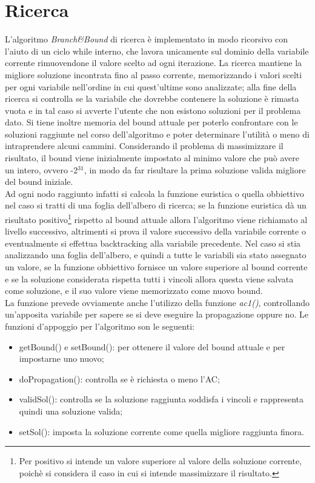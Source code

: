 \documentclass[a4paper,12pt,italian]{article}
\begin{document}
\section{Ricerca}

L'algoritmo \textit{Branch\&Bound} di ricerca \`e implementato in modo ricorsivo
con l'aiuto di un ciclo while interno, che lavora unicamente sul
dominio della variabile corrente rimuovendone il valore scelto ad ogni iterazione.
La ricerca mantiene la migliore soluzione incontrata fino al passo corrente,
memorizzando i valori scelti per ogni variabile nell'ordine in cui quest'ultime sono analizzate;
alla fine della ricerca si controlla se la variabile che dovrebbe contenere la soluzione
\`e rimasta vuota e in tal caso si avverte l'utente che non esistono soluzioni per il problema dato.
Si tiene inoltre memoria del bound attuale per poterlo confrontare con le
soluzioni raggiunte nel corso dell'algoritmo e poter determinare l'utilit\`a o meno
di intraprendere alcuni cammini. Considerando il problema di massimizzare il risultato,
il bound viene inizialmente impostato al minimo valore che pu\`o avere un intero, ovvero -2$^{31}$, in modo
da far risultare la prima soluzione valida migliore del bound iniziale.\\
Ad ogni nodo raggiunto infatti si calcola la funzione euristica o quella obbiettivo nel caso si tratti
di una foglia dell'albero di ricerca; se la funzione euristica d\`a un
risultato positivo\footnote{Per positivo si intende un valore
  superiore al valore della soluzione corrente, poich\`e
si considera il caso in cui si intende massimizzare il risultato.} 
rispetto al bound attuale allora l'algoritmo viene
richiamato al livello successivo, altrimenti si prova il valore successivo
della variabile corrente o eventualmente si effettua backtracking alla
variabile precedente. Nel caso si stia analizzando una foglia dell'albero, e quindi a tutte
le variabili sia stato assegnato un valore, se la funzione obbiettivo fornisce
un valore superiore al bound corrente e se la soluzione considerata rispetta
tutti i vincoli allora questa viene salvata come soluzione, e il suo valore viene
memorizzato come nuovo bound.\\
La funzione prevede ovviamente anche l'utilizzo della funzione \textit{ac1()}, controllando
un'apposita variabile per sapere se si deve eseguire la propagazione oppure no.
Le funzioni d'appoggio per l'algoritmo son le seguenti:

\begin{itemize}
 \item getBound() e setBound(): per ottenere il valore del bound attuale e per impostarne uno nuovo;
 \item doPropagation(): controlla se \`e richiesta o meno l'AC;
 \item validSol(): controlla se la soluzione raggiunta soddisfa i vincoli e rappresenta quindi
una soluzione valida; 
 \item setSol(): imposta la soluzione corrente come quella migliore raggiunta finora.
\end{itemize}
\end{document}
